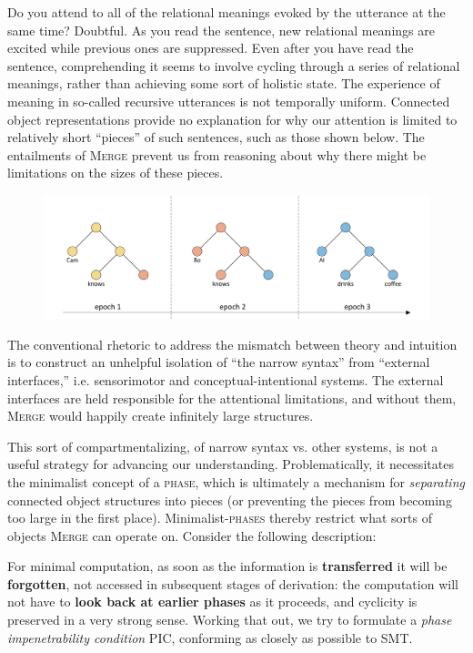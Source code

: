   Do you attend to all of the relational meanings evoked by the utterance at the same time? Doubtful. As you read the sentence, new relational meanings are excited while previous ones are suppressed. Even after you have read the sentence, comprehending it seems to involve cycling through a series of relational meanings, rather than achieving some sort of holistic state. The experience of meaning in so-called recursive utterances is not temporally uniform. Connected object representations provide no explanation for why our attention is limited to relatively short “pieces” of such sentences, such as those shown below. The entailments of \textsc{Merge} prevent us from reasoning about why there might be limitations on the sizes of these pieces.

  
\begin{figure}
\includegraphics[width=\textwidth]{figures/Tilsen-img111.png}
\caption{\missingcaption}
\label{fig:5:7}
\end{figure}
 

  The conventional rhetoric to address the mismatch between theory and intuition is to construct an unhelpful isolation of “the narrow syntax” from “external interfaces,” i.e. sensorimotor and conceptual-intentional systems. The external interfaces are held responsible for the attentional limitations, and without them, \textsc{Merge} would happily create infinitely large structures. 

  This sort of compartmentalizing, of narrow syntax vs. other systems, is not a useful strategy for advancing our understanding. Problematically, it necessitates the minimalist concept of a \textsc{phase}, which is ultimately a mechanism for \textit{separating} connected object structures into pieces (or preventing the pieces from becoming too large in the first place). Minimalist-\textsc{phases} thereby restrict what sorts of objects \textsc{Merge} can operate on. Consider the following description:

For minimal computation, as soon as the information is \textbf{transferred} it will be \textbf{forgotten}, not accessed in subsequent stages of derivation: the computation will not have to \textbf{look back at earlier phases} as it proceeds, and cyclicity is preserved in a very strong sense. Working that out, we try to formulate a \textit{phase \textit{impenetrability} condition} PIC, conforming as closely as possible to SMT. \citep{Chomsky2008}

